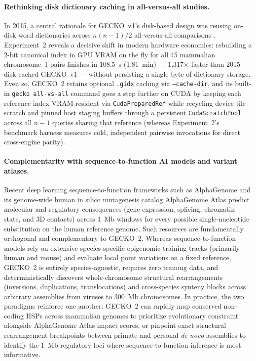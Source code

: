 \documentclass[pdflatex,sn-vancouver,Numbered]{sn-jnl}
\begin{document}
\paragraph{Rethinking disk dictionary caching in all-versus-all studies.}
In 2015, a central rationale for GECKO~v1's disk-based design was reusing on-disk word dictionaries across $n(n-1)/2$ all-versus-all comparisons \cite{torreno2015gecko}. Experiment~2 reveals a decisive shift in modern hardware economics: rebuilding a 2-bit canonical index in GPU VRAM on the fly for all 45 mammalian chromosome~1 pairs finishes in 108.5~s (1.81~min) --- 1,317$\times$ faster than 2015 disk-cached GECKO~v1 --- without persisting a single byte of dictionary storage. Even so, GECKO~2 retains optional \texttt{.gidx} caching via \texttt{--cache-dir}, and its built-in \texttt{gecko all-vs-all} command goes a step further on CUDA by keeping each reference index VRAM-resident via \texttt{CudaPreparedRef} while recycling device tile scratch and pinned host staging buffers through a persistent \texttt{CudaScratchPool} across all $n-1$ queries sharing that reference (whereas Experiment~2's benchmark harness measures cold, independent pairwise invocations for direct cross-engine parity).

\paragraph{Complementarity with sequence-to-function AI models and variant atlases.}
Recent deep learning sequence-to-function frameworks such as AlphaGenome \cite{avsec2026alphagenome} and its genome-wide human in silico mutagenesis catalog AlphaGenome Atlas \cite{cheng2026alphagenomeatlas} predict molecular and regulatory consequences (gene expression, splicing, chromatin state, and 3D contacts) across 1~Mb windows for every possible single-nucleotide substitution on the human reference genome. Such resources are fundamentally orthogonal and complementary to GECKO~2. Whereas sequence-to-function models rely on extensive species-specific epigenomic training tracks (primarily human and mouse) and evaluate local point variations on a fixed reference, GECKO~2 is entirely species-agnostic, requires zero training data, and deterministically discovers whole-chromosome structural rearrangements (inversions, duplications, translocations) and cross-species synteny blocks across arbitrary assemblies from viruses to 300~Mb chromosomes. In practice, the two paradigms reinforce one another: GECKO~2 can rapidly map conserved non-coding HSPs across mammalian genomes to prioritize evolutionary constraint alongside AlphaGenome Atlas impact scores, or pinpoint exact structural rearrangement breakpoints between primate and personal \textit{de novo} assemblies to identify the 1~Mb regulatory loci where sequence-to-function inference is most informative.
\end{document}
